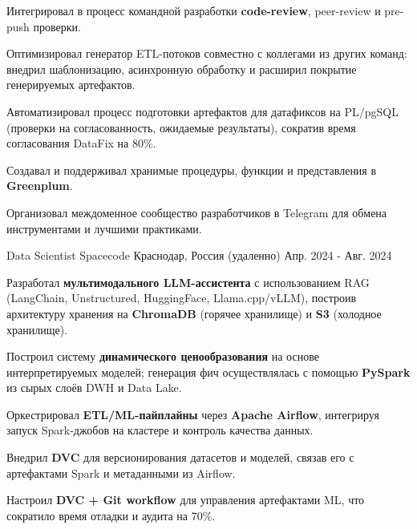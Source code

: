\begin{cventries}
{\begin{cvitems}
        \item {Интегрировал в процесс командной разработки \textbf{code-review}, peer-review и pre-push проверки.}
        \item {Оптимизировал генератор ETL-потоков совместно с коллегами из других команд: внедрил шаблонизацию, асинхронную обработку и расширил покрытие генерируемых артефактов.}
        \item {Автоматизировал процесс подготовки артефактов для датафиксов на PL/pgSQL (проверки на согласованность, ожидаемые результаты), сократив время согласования DataFix на 80\%.}
        \item {Создавал и поддерживал хранимые процедуры, функции и представления в \textbf{Greenplum}.}
        \item {Организовал междоменное сообщество разработчиков в Telegram для обмена инструментами и лучшими практиками.}
      \end{cvitems}
    }


  \cventry
    {Data Scientist} %
    {Spacecode} %
    {Краснодар, Россия (удаленно)} %
    {Апр. 2024 - Авг. 2024} %
    {
      \begin{cvitems}
        \item {Разработал \textbf{мультимодального LLM-ассистента} с использованием RAG (LangChain, Unstructured, HuggingFace, Llama.cpp/vLLM), построив архитектуру хранения на \textbf{ChromaDB} (горячее хранилище) и \textbf{S3} (холодное хранилище).}
        \item {Построил систему \textbf{динамического ценообразования} на основе интерпретируемых моделей; генерация фич осуществлялась с помощью \textbf{PySpark} из сырых слоёв DWH и Data Lake.}
        \item {Оркестрировал \textbf{ETL/ML-пайплайны} через \textbf{Apache Airflow}, интегрируя запуск Spark-джобов на кластере и контроль качества данных.}
        \item {Внедрил \textbf{DVC} для версионирования датасетов и моделей, связав его с артефактами Spark и метаданными из Airflow.}
        \item {Настроил \textbf{DVC + Git workflow} для управления артефактами ML, что сократило время отладки и аудита на 70\%.}
      \end{cvitems}
    }



\end{cventries}

